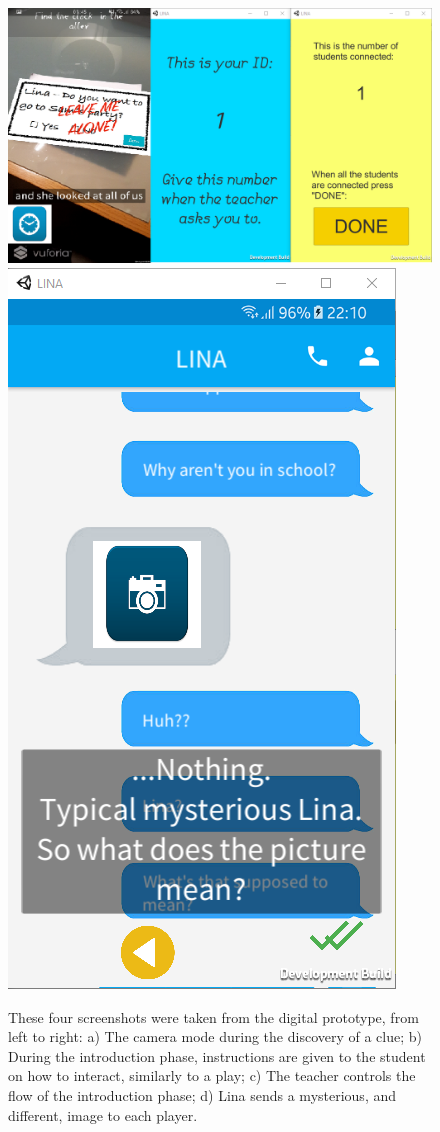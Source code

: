 \documentclass[runningheads]{llncs}
\begin{document}
\begin{figure}
    \centering
    \includegraphics[scale = 0.28]{Screenshot_28.png}
    \includegraphics[scale = 0.28]{Screenshot_30.png}
    \caption{These four screenshots were taken from the digital prototype, from left to right: a) The camera mode during the discovery of a clue; b) During the introduction phase, instructions are given to the student on how to interact, similarly to a play; c) The teacher controls the flow of the introduction phase; d) Lina sends a mysterious, and different, image to each player.}
    \label{fig:digital}
\end{figure}
\end{document}
